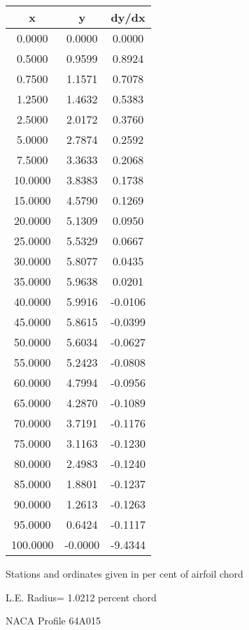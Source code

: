 \documentclass[11pt]{book}
\begin{document}
 \vspace{8mm}
 \begin{tabular}{|c|c|c|} \hline 
  x  &  y  &  dy/dx \\
 \hline
0.0000 & 0.0000 & 0.0000 \\
0.5000 & 0.9599 & 0.8924 \\
0.7500 & 1.1571 & 0.7078 \\
1.2500 & 1.4632 & 0.5383 \\
2.5000 & 2.0172 & 0.3760 \\
5.0000 & 2.7874 & 0.2592 \\
7.5000 & 3.3633 & 0.2068 \\
10.0000 & 3.8383 & 0.1738 \\
15.0000 & 4.5790 & 0.1269 \\
20.0000 & 5.1309 & 0.0950 \\
25.0000 & 5.5329 & 0.0667 \\
30.0000 & 5.8077 & 0.0435 \\
35.0000 & 5.9638 & 0.0201 \\
40.0000 & 5.9916 & -0.0106 \\
45.0000 & 5.8615 & -0.0399 \\
50.0000 & 5.6034 & -0.0627 \\
55.0000 & 5.2423 & -0.0808 \\
60.0000 & 4.7994 & -0.0956 \\
65.0000 & 4.2870 & -0.1089 \\
70.0000 & 3.7191 & -0.1176 \\
75.0000 & 3.1163 & -0.1230 \\
80.0000 & 2.4983 & -0.1240 \\
85.0000 & 1.8801 & -0.1237 \\
90.0000 & 1.2613 & -0.1263 \\
95.0000 & 0.6424 & -0.1117 \\
100.0000 & -0.0000 & -9.4344 \\
 \hline
 \end{tabular}
 \vspace{8mm}


Stations and ordinates given in per cent of airfoil chord 


L.E. Radius=  1.0212 percent chord
 \newpage
  \label{p64A015}
 \begin{Large}
 NACA Profile 64A015
 \end{Large}
  
\end{document}
